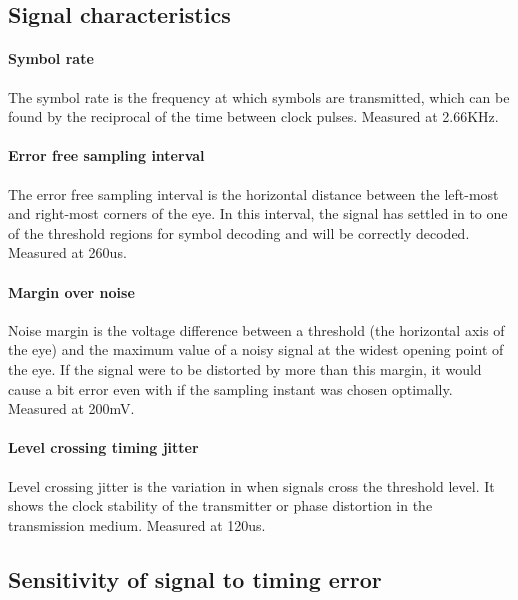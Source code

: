 \documentclass[11pt]{article}
\begin{document}
\subsection{Signal characteristics}
\paragraph{Symbol rate}
The symbol rate is the frequency at which symbols are transmitted, which can be
found by the reciprocal of the time between clock pulses. Measured at 2.66KHz.
\paragraph{Error free sampling interval}
The error free sampling interval is the horizontal distance between the
left-most and right-most corners of the eye. In this interval, the signal has
settled in to one of the threshold regions for symbol decoding and will be
correctly decoded. Measured at 260us.
\paragraph{Margin over noise}
Noise margin is the voltage difference between a threshold (the horizontal axis
of the eye) and the maximum value of a noisy signal at the widest opening point
of the eye. If the signal were to be distorted by more than this margin, it
would cause a bit error even with if the sampling instant was chosen optimally.
Measured at 200mV.
\paragraph{Level crossing timing jitter}
Level crossing jitter is the variation in when signals cross the threshold
level. It shows the clock stability of the transmitter or phase distortion in
the transmission medium. Measured at 120us.

\subsection{Sensitivity of signal to timing error}
\end{document}
